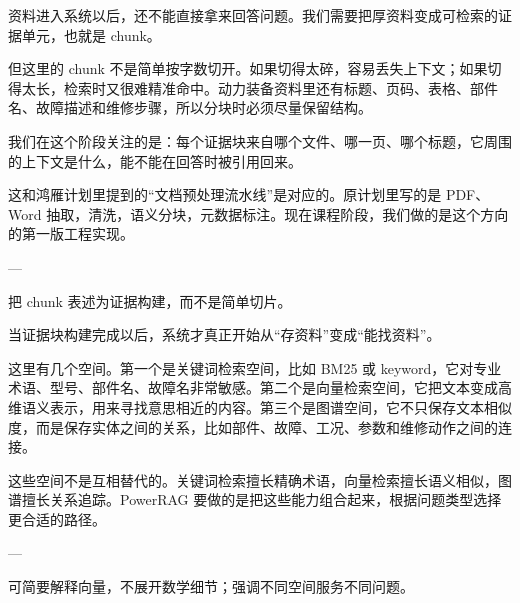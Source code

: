 \documentclass[10pt, a4paper]{ctexart}
\begin{document}
\begin{tcolorbox}[colback=white, colframe=primary!35, title={\textbf{第 9 页：把厚资料变成可检索证据}}, beforeafter skip=2.0pt]
\begin{minipage}[t]{0.72\textwidth}
  \linespread{1.0}\selectfont\footnotesize
  资料进入系统以后，还不能直接拿来回答问题。我们需要把厚资料变成可检索的证据单元，也就是 chunk。

但这里的 chunk 不是简单按字数切开。如果切得太碎，容易丢失上下文；如果切得太长，检索时又很难精准命中。动力装备资料里还有标题、页码、表格、部件名、故障描述和维修步骤，所以分块时必须尽量保留结构。

我们在这个阶段关注的是：每个证据块来自哪个文件、哪一页、哪个标题，它周围的上下文是什么，能不能在回答时被引用回来。

这和鸿雁计划里提到的“文档预处理流水线”是对应的。原计划里写的是 PDF、Word 抽取，清洗，语义分块，元数据标注。现在课程阶段，我们做的是这个方向的第一版工程实现。

---
\end{minipage}
\hfill
\begin{minipage}[t]{0.25\textwidth}
  \fontsize{7.5}{9.5}\selectfont
  \begin{tcolorbox}[colback=orange!5, colframe=orange!45, title=\textbf{讲述重点}, left=0.6mm, right=0.6mm, top=0.8mm, bottom=0.8mm, arc=0.8mm, boxrule=0.4pt, beforeafter skip=0pt]
    把 chunk 表述为证据构建，而不是简单切片。
  \end{tcolorbox}
\end{minipage}
\end{tcolorbox}

\begin{tcolorbox}[colback=white, colframe=primary!35, title={\textbf{第 10 页：证据进入检索空间和图谱空间}}, beforeafter skip=2.0pt]
\begin{minipage}[t]{0.72\textwidth}
  \linespread{1.0}\selectfont\footnotesize
  当证据块构建完成以后，系统才真正开始从“存资料”变成“能找资料”。

这里有几个空间。第一个是关键词检索空间，比如 BM25 或 keyword，它对专业术语、型号、部件名、故障名非常敏感。第二个是向量检索空间，它把文本变成高维语义表示，用来寻找意思相近的内容。第三个是图谱空间，它不只保存文本相似度，而是保存实体之间的关系，比如部件、故障、工况、参数和维修动作之间的连接。

这些空间不是互相替代的。关键词检索擅长精确术语，向量检索擅长语义相似，图谱擅长关系追踪。PowerRAG 要做的是把这些能力组合起来，根据问题类型选择更合适的路径。

---
\end{minipage}
\hfill
\begin{minipage}[t]{0.25\textwidth}
  \fontsize{7.5}{9.5}\selectfont
  \begin{tcolorbox}[colback=orange!5, colframe=orange!45, title=\textbf{讲述重点}, left=0.6mm, right=0.6mm, top=0.8mm, bottom=0.8mm, arc=0.8mm, boxrule=0.4pt, beforeafter skip=0pt]
    可简要解释向量，不展开数学细节；强调不同空间服务不同问题。
  \end{tcolorbox}
\end{minipage}
\end{tcolorbox}
\end{document}
